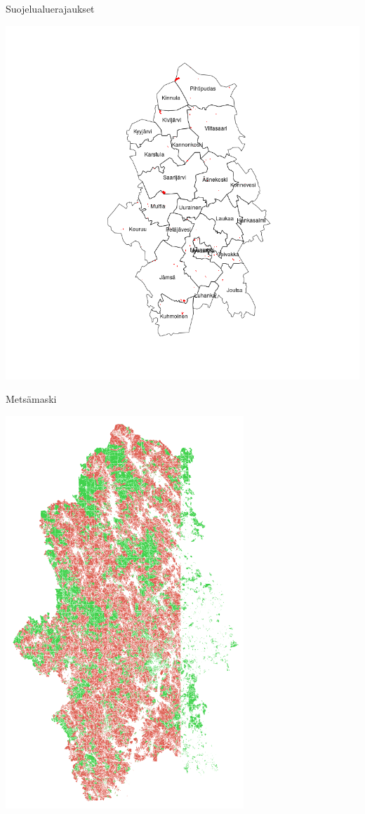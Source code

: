 \documentclass{beamer}
\begin{document}
\begin{frame}{Suojelualuerajaukset}
  \begin{center}
    \includegraphics[height=0.9\textheight]{suojelualueet.png}
  \end{center}
\end{frame}

\begin{frame}{Metsämaski}
  \begin{center}
    \includegraphics[height=0.9\textheight]{maski.png}
  \end{center}
\end{frame}
\end{document}
